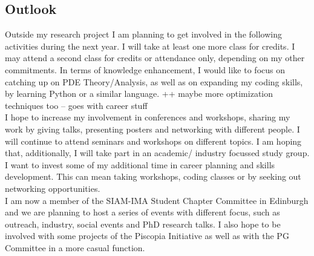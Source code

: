 \documentclass[11pt, a4paper]{article}
\theoremstyle{definition}
\begin{document}
\subsection{Outlook}
Outside my research project I am planning to get involved in the following activities during the next year.
I will take at least one more class for credits. I may attend a second class for credits or attendance only, depending on my other commitments. In terms of knowledge enhancement, I would like to focus on catching up on PDE Theory/Analysis, as well as on expanding my coding skills, by learning Python or a similar language. ++ maybe more optimization techniques too -- goes with career stuff\\
I hope to increase my involvement in conferences and workshops, sharing my work by giving talks, presenting posters and networking with different people. I will continue to attend seminars and workshops on different topics. I am hoping that, additionally, I will take part in an academic/ industry focussed study group.\\
I want to invest some of my additional time in career planning and skills development. This can mean taking workshops, coding classes or by seeking out networking opportunities.\\ 	
I am now a member of the SIAM-IMA Student Chapter Committee in Edinburgh and we are planning to host a series of events with different focus, such as outreach, industry, social events and PhD research talks. 
I also hope to be involved with some projects of the Piscopia Initiative as well as with the PG Committee in a more casual function. \\
\end{document}
